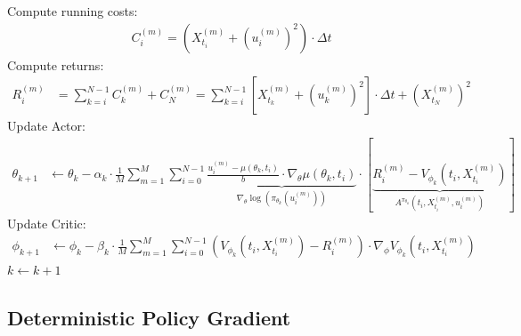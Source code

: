 \documentclass[a4paper, 12pt]{scrartcl}
\newcommand{\rot}[2][rot]{\textcolor{#1}{#2}}
\begin{document}
\begin{algorithm}
\begin{algorithmic}[H]
                    \State Compute running costs:
                    \begin{align*}
                        C_i^{(m)} = (X_{t_i}^{(m)} + (u_i^{(m)})^2) \cdot \Delta t
                    \end{align*}
                \EndFor
                \State Compute returns:
                \begin{align*}
                    R_i^{(m)} 
                    &= \sum_{k=i}^{N-1} C_k^{(m)} + C_N^{(m)} 
                    = \sum_{k=i}^{N-1}
                    \left[
                        X_{t_{k}}^{(m)} + \left(u_{k}^{(m)}\right)^2
                    \right]
                    \cdot \Delta t
                    +
                    (X_{t_N}^{(m)})^2
                \end{align*} \Comment{\rot{MC}}
            \EndFor
            \State Update Actor:
            \begin{align*}
                \theta_{k+1} &\leftarrow \theta_k - \alpha_k
                \cdot 
                \frac{1}{M} \sum_{m=1}^M 
                \sum_{i=0}^{N-1} 
                \underbrace{
                    \frac{u_{i}^{(m)} - \mu(\theta_k,t_i)}{b} 
                    \cdot \nabla_{\theta} \mu(\theta_k,t_i)
                }_{
                    \nabla_{\theta} \log(\pi_{\theta_k}(u_i^{(m)}))
                }
                \cdot 
                \left[
                    \underbrace{
                        R_i^{(m)}
                        -
                        V_{\phi_k}(t_i , X_{t_i}^{(m)})
                    }_{
                        A^{\pi_{\theta_k}}(t_i,X_{t_i}^{(m)}, u_i^{(m)})
                    }
                \right]
            \end{align*}
            \State Update Critic:
            \begin{align*}
                \phi_{k+1} &\leftarrow \phi_k 
                - \beta_k
                \cdot 
                \frac{1}{M}
                \sum_{m=1}^{M}
                \sum_{i=0}^{N-1}
                (V_{\phi_k}(t_i , X_{t_i}^{(m)}) - R_i^{(m)})
                \cdot
                \nabla_{\phi} V_{\phi_k}(t_i , X_{t_i}^{(m)})
            \end{align*}
        \State $k \leftarrow k+1$
        \EndWhile
    \end{algorithmic}
\end{algorithm}

\newpage

\subsection{Deterministic Policy Gradient} 
\end{document}
